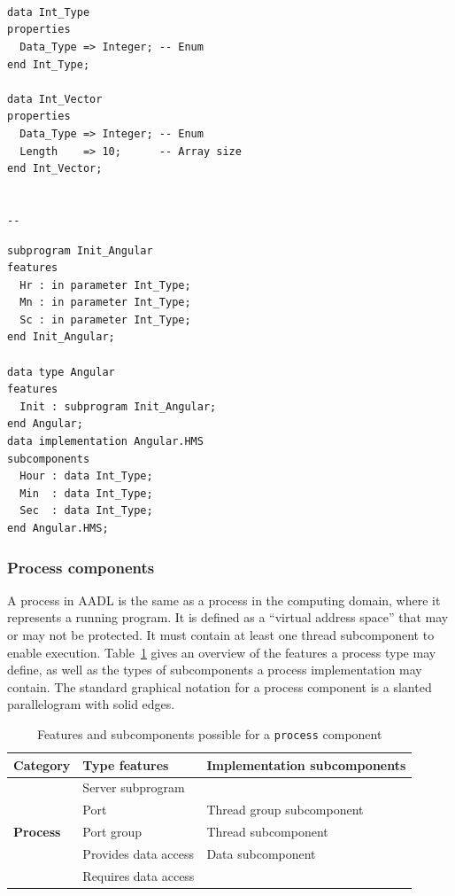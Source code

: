 \lstset{language=aadl}
\begin{minipage}{0.4\linewidth}
\centering
\lstset{language=aadl}
\begin{lstlisting}[label=lst:data_basic_ex, caption=Integer data type and
    10 element Integer vector]



data Int_Type
properties
  Data_Type => Integer; -- Enum
end Int_Type;

data Int_Vector
properties
  Data_Type => Integer; -- Enum
  Length    => 10;      -- Array size
end Int_Vector;


--
\end{lstlisting}
\end{minipage}
\hspace{1cm}
\begin{minipage}{0.4\linewidth}
\begin{lstlisting}[label=lst:data_comp_ex, caption=Structured data type to
    represent angles]
subprogram Init_Angular
features
  Hr : in parameter Int_Type;
  Mn : in parameter Int_Type;
  Sc : in parameter Int_Type;
end Init_Angular;

data type Angular
features
  Init : subprogram Init_Angular;
end Angular;
data implementation Angular.HMS
subcomponents
  Hour : data Int_Type;
  Min  : data Int_Type;
  Sec  : data Int_Type;
end Angular.HMS;
\end{lstlisting}
\end{minipage}

\subsubsection{Process components} A process in AADL is the same as a
process in the computing domain, where it represents a running
program. It is defined as a ``virtual address space'' that may or may
not be protected. It must contain at least one thread subcomponent to
enable execution. Table~\ref{tab:proc_rules} gives an overview of the
features a process type may define, as well as the types of
subcomponents a process implementation may contain. The standard
graphical notation for a process component is a slanted parallelogram
with solid edges. 

\begin{table}
\centering
\begin{tabular}{|l|l|l|}
\hline
\textbf{Category} & \textbf{Type features} & \textbf{Implementation
  subcomponents} \\
\hline
 & Server subprogram & \\
 & Port & Thread group subcomponent \\
\textbf{Process} & Port group & Thread subcomponent \\
 & Provides data access & Data subcomponent \\
 & Requires data access & \\
\hline
\end{tabular}
\caption{Features and subcomponents possible for a \texttt{process}
  component}
\label{tab:proc_rules}
\end{table}

